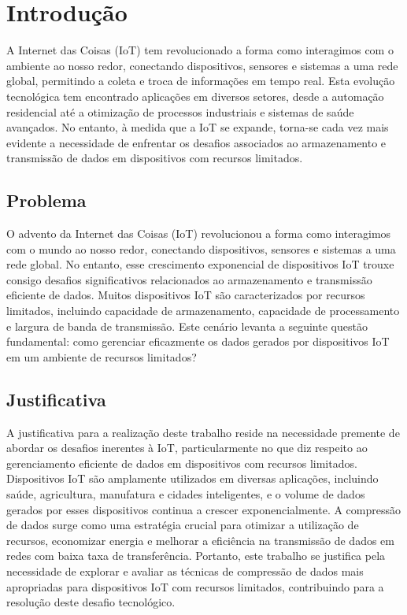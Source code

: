 \chapter{Introdução}
\label{cap:introducao}

A Internet das Coisas (IoT) tem revolucionado a forma como interagimos com o ambiente ao nosso redor, conectando dispositivos, sensores e sistemas a uma rede global, permitindo a coleta e troca de informações em tempo real. Esta evolução tecnológica tem encontrado aplicações em diversos setores, desde a automação residencial até a otimização de processos industriais e sistemas de saúde avançados. No entanto, à medida que a IoT se expande, torna-se cada vez mais evidente a necessidade de enfrentar os desafios associados ao armazenamento e transmissão de dados em dispositivos com recursos limitados.

\section{Problema}
\label{sec:problema}

O advento da Internet das Coisas (IoT) revolucionou a forma como interagimos com o mundo ao nosso redor, conectando dispositivos, sensores e sistemas a uma rede global. No entanto, esse crescimento exponencial de dispositivos IoT trouxe consigo desafios significativos relacionados ao armazenamento e transmissão eficiente de dados. Muitos dispositivos IoT são caracterizados por recursos limitados, incluindo capacidade de armazenamento, capacidade de processamento e largura de banda de transmissão. Este cenário levanta a seguinte questão fundamental: como gerenciar eficazmente os dados gerados por dispositivos IoT em um ambiente de recursos limitados?

\section{Justificativa}
\label{sec:justificativa}

A justificativa para a realização deste trabalho reside na necessidade premente de abordar os desafios inerentes à IoT, particularmente no que diz respeito ao gerenciamento eficiente de dados em dispositivos com recursos limitados. Dispositivos IoT são amplamente utilizados em diversas aplicações, incluindo saúde, agricultura, manufatura e cidades inteligentes, e o volume de dados gerados por esses dispositivos continua a crescer exponencialmente. A compressão de dados surge como uma estratégia crucial para otimizar a utilização de recursos, economizar energia e melhorar a eficiência na transmissão de dados em redes com baixa taxa de transferência. Portanto, este trabalho se justifica pela necessidade de explorar e avaliar as técnicas de compressão de dados mais apropriadas para dispositivos IoT com recursos limitados, contribuindo para a resolução deste desafio tecnológico.

